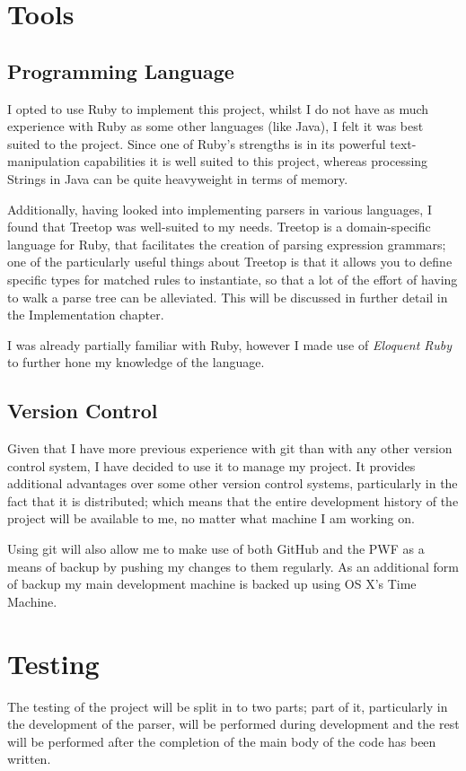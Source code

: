 \section{Tools}
  \subsection{Programming Language}
    I opted to use Ruby to implement this project, whilst I do not have as much
    experience with Ruby as some other languages (like Java), I felt it was best
    suited to the project. Since one of Ruby's strengths is in its powerful
    text-manipulation capabilities it is well suited to this project, whereas
    processing Strings in Java can be quite heavyweight in terms of memory.

    Additionally, having looked into implementing parsers in various languages,
    I found that Treetop\cite{website:treetop} was well-suited to my needs.
    Treetop is a domain-specific language for Ruby, that facilitates the
    creation of parsing expression grammars; one of the particularly useful
    things about Treetop is that it allows you to define specific types for
    matched rules to instantiate, so that a lot of the effort of having to walk
    a parse tree can be alleviated. This will be discussed in further detail in
    the Implementation chapter.

    I was already partially familiar with Ruby, however I made use of
    \emph{Eloquent Ruby}\cite{book:eloquent_ruby} to further hone my knowledge
    of the language.
  \subsection{Version Control}
    Given that I have more previous experience with git than with any other
    version control system, I have decided to use it to manage my project. It
    provides additional advantages over some other version control systems,
    particularly in the fact that it is distributed; which means that the entire
    development history of the project will be available to me, no matter what
    machine I am working on.

    Using git will also allow me to make use of both GitHub and the PWF as a
    means of backup by pushing my changes to them regularly. As an additional
    form of backup my main development machine is backed up using OS X's Time
    Machine.

\section{Testing}
The testing of the project will be split in to two parts; part of it,
particularly in the development of the parser, will be performed during
development and the rest will be performed after the completion of the main
body of the code has been written.

